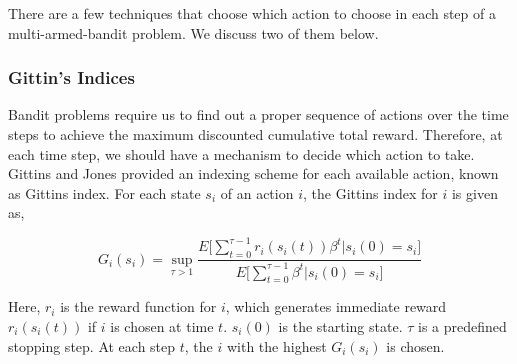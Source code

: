 \documentclass[english]{tktltiki}
\begin{document}
There are a few techniques that choose which action to choose in each step of a multi-armed-bandit problem. We discuss two of them below.

\subsubsection{Gittin's Indices}

Bandit problems require us to find out a proper sequence of actions over the time steps to achieve the maximum discounted cumulative total reward. Therefore, at each time step, we should have a mechanism to decide which action to take. Gittins and Jones \cite{gittins_indices} provided an indexing scheme for each available action, known as Gittins index. For each state $s_i$ of an action $i$, the Gittins index for $i$ is given as,

\begin{equation}
G_i(s_i) = \sup_{\tau > 1}{\frac{E\Big[\sum_{t = 0}^{\tau - 1} r_i(s_i(t))\beta^t | s_i(0) = s_i\Big]}{E\Big[\sum_{t = 0}^{\tau - 1}\beta^t | s_i(0) = s_i\Big]}}
\end{equation}

Here, $r_i$ is the reward function for $i$, which generates immediate reward  $r_i(s_i(t))$ if $i$ is chosen at time $t$. $s_i(0)$ is the starting state. $\tau$ is a predefined stopping step. At each step $t$, the $i$ with the highest $G_i(s_i)$ is chosen.
\end{document}
